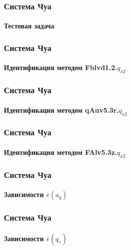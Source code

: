 \documentclass[10pt,utf8]{beamer}
\begin{document}

\begin{frame}
  \frametitle{Система Чуа}
  \framesubtitle{Тестовая задача}


\end{frame}




\begin{frame}
  \frametitle{Система Чуа}
  \framesubtitle{Идентификация методом  Fblvd1.2.$q_{x2}$ }


\end{frame}




\begin{frame}
  \frametitle{Система Чуа}
  \framesubtitle{Идентификация методом qAuv5.3r.$q_{x2}$}


\end{frame}




\begin{frame}
  \frametitle{Система Чуа}
  \framesubtitle{Идентификация методом FAlv5.3z.$q_{x2}$}


\end{frame}




\begin{frame}
  \frametitle{Система Чуа}
  \framesubtitle{Зависимости $\overline{e}(a_q)$}


\end{frame}




\begin{frame}
  \frametitle{Система Чуа}
  \framesubtitle{Зависимости $\overline{e}(q_\gamma)$}


\end{frame}

\end{document}
